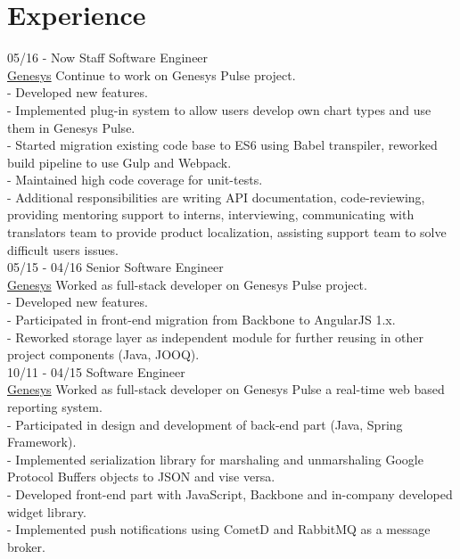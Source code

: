 \documentclass[]{friggeri-cv}
\begin{document}
\section{Experience}
\begin{entrylist}
  \entry
    {05/16 - Now}
    {Staff Software Engineer\\}
    {\href{http://www.genesys.com/}{Genesys}}
    {Continue to work on Genesys Pulse project. \\
    - Developed new features. \\
    - Implemented plug-in system to allow users develop own chart types and use them in Genesys Pulse. \\
    - Started migration existing code base to ES6 using Babel transpiler, reworked build pipeline to use Gulp and Webpack.\\
    - Maintained high code coverage for unit-tests. \\
    - Additional responsibilities are writing API documentation, code-reviewing, providing mentoring support to interns, interviewing, communicating with translators team to provide product localization, assisting support team to solve difficult users issues. \\}
    \entry
    {05/15 - 04/16}
    {Senior Software Engineer\\}
    {\href{http://www.genesys.com/}{Genesys}}
    {Worked as full-stack developer on Genesys Pulse project. \\
    - Developed new features. \\- Participated in front-end migration from Backbone to AngularJS 1.x. \\
    - Reworked storage layer as independent module for further reusing in other project components (Java, JOOQ).\\}
    \entry
    {10/11 - 04/15}
    {Software Engineer\\}
    {\href{http://www.genesys.com/}{Genesys}}
    {Worked as full-stack developer on Genesys Pulse a real-time web based reporting system. \\
    - Participated in design and development of back-end part (Java, Spring Framework). \\
    - Implemented serialization library for marshaling and unmarshaling Google Protocol Buffers objects to JSON and vise versa. \\
    - Developed front-end part with JavaScript, Backbone and in-company developed widget library. \\
    - Implemented push notifications using CometD and RabbitMQ as a message broker.\\
}
\end{entrylist}
\end{document}
